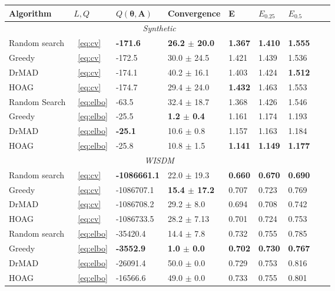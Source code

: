 \documentclass[smallcondensed]{svjour3}
\begin{document}
\begin{table}
\footnotesize
\begin{tabularx}{\textwidth}{ |X|p{0.75cm}|X|X|p{1cm}|X|X|X|X|}

\hline
\textbf{Algorithm} & $L, Q$  & $Q(\boldsymbol{\theta}, \mathbf{A})$ & Convergence & E & $E_{0.25}$ & $E_{0.5}$\\ 
\hline
\multicolumn{7}{|c|}{\textit{Synthetic}}  \\
\hline
Random search & ~\eqref{eq:cv} & \bf -171.6  &\bf 26.2 $\pm$ 20.0  & \bf 1.367 &\bf 1.410 &\bf 1.555 \\
\hline
Greedy & ~\eqref{eq:cv} & -172.5 & 30.0 $\pm$ 24.5 & 1.421 & 1.439 &  1.536\\
\hline
DrMAD & ~\eqref{eq:cv} & -174.1 & 40.2 $\pm$ 16.1 &  1.403 & 1.424 & \bf 1.512 \\
\hline
HOAG & ~\eqref{eq:cv} &-174.7 & 29.4 $\pm$ 24.0 &   \bf 1.432  & 1.463 & 1.553\\
\hline
Random Search & ~\eqref{eq:elbo} & -63.5  & 32.4 $\pm$ 18.7  & 1.368 & 1.426 & 1.546  \\
\hline
Greedy & ~\eqref{eq:elbo} & -25.5 & \bf 1.2 $\pm$ 0.4 & 1.161 & 1.174 & 1.193\\
\hline
DrMAD & ~\eqref{eq:elbo} & \bf -25.1 &  10.6 $\pm$ 0.8 &  1.157 & 1.163 &  1.184\\
\hline
HOAG & ~\eqref{eq:elbo} &-25.8 & 10.8 $\pm$ 1.5&   \bf 1.141  & \bf 1.149 & \bf 1.177\\
\hline


\multicolumn{7}{|c|}{\textit{WISDM}}  \\
\hline
Random search & ~\eqref{eq:cv} & \bf -1086661.1  & 22.0 $\pm$ 19.3  & \bf 0.660 & \bf 0.670 & \bf 0.690  \\
\hline
Greedy & ~\eqref{eq:cv} & -1086707.1 & \bf 15.4 $\pm$ 17.2 & 0.707 &  0.723  &  0.769\\
\hline
DrMAD & ~\eqref{eq:cv} & -1086708.2 & 29.2 $\pm$ 8.0 &  0.694 &  0.708 & 0.742 \\
\hline
HOAG & ~\eqref{eq:cv} & -1086733.5 & 28.2 $\pm$ 7.13&   0.701 & 0.724 & 0.753 \\
\hline
Random search & ~\eqref{eq:elbo} & -35420.4 &   14.4 $\pm$ 7.8  &   0.732 &   0.755 & 0.785 \\
\hline
Greedy & ~\eqref{eq:elbo} & \bf -3552.9 &\bf 1.0 $\pm$ 0.0  &   \bf 0.702 & \bf 0.730  &  \bf 0.767\\
\hline
DrMAD & ~\eqref{eq:elbo} & -26091.4 &   50.0 $\pm$ 0.0  & 0.729 &  0.753 & 0.816 \\
\hline
HOAG & ~\eqref{eq:elbo} &  -16566.6 & 49.0 $\pm$ 0.0  &  0.733 &  0.755 &  0.801 \\
\hline




\end{tabularx}
\end{table}
\end{document}
